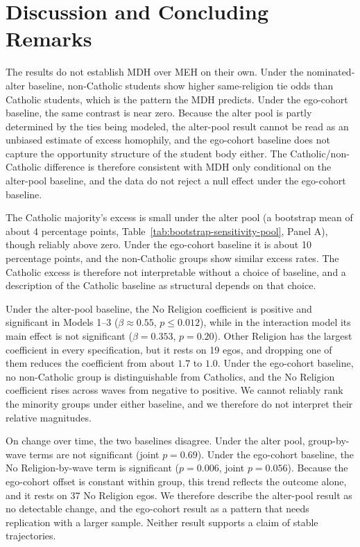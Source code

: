 \documentclass[11pt]{article}
\begin{document}
\section{Discussion and Concluding Remarks}

The results do not establish MDH over MEH on their own. Under the nominated-alter baseline, non-Catholic students show higher same-religion tie odds than Catholic students, which is the pattern the MDH predicts. Under the ego-cohort baseline, the same contrast is near zero. Because the alter pool is partly determined by the ties being modeled, the alter-pool result cannot be read as an unbiased estimate of excess homophily, and the ego-cohort baseline does not capture the opportunity structure of the student body either. The Catholic/non-Catholic difference is therefore consistent with MDH only conditional on the alter-pool baseline, and the data do not reject a null effect under the ego-cohort baseline.

The Catholic majority's excess is small under the alter pool (a bootstrap mean of about 4 percentage points, Table~\ref{tab:bootstrap-sensitivity-pool}, Panel A), though reliably above zero. Under the ego-cohort baseline it is about 10 percentage points, and the non-Catholic groups show similar excess rates. The Catholic excess is therefore not interpretable without a choice of baseline, and a description of the Catholic baseline as structural depends on that choice.

Under the alter-pool baseline, the No Religion coefficient is positive and significant in Models 1--3 ($\beta \approx 0.55$, $p \le 0.012$), while in the interaction model its main effect is not significant ($\beta = 0.353$, $p = 0.20$). Other Religion has the largest coefficient in every specification, but it rests on 19 egos, and dropping one of them reduces the coefficient from about $1.7$ to $1.0$. Under the ego-cohort baseline, no non-Catholic group is distinguishable from Catholics, and the No Religion coefficient rises across waves from negative to positive. We cannot reliably rank the minority groups under either baseline, and we therefore do not interpret their relative magnitudes.

On change over time, the two baselines disagree. Under the alter pool, group-by-wave terms are not significant (joint $p = 0.69$). Under the ego-cohort baseline, the No Religion-by-wave term is significant ($p = 0.006$, joint $p = 0.056$). Because the ego-cohort offset is constant within group, this trend reflects the outcome alone, and it rests on 37 No Religion egos. We therefore describe the alter-pool result as no detectable change, and the ego-cohort result as a pattern that needs replication with a larger sample. Neither result supports a claim of stable trajectories.
\end{document}
